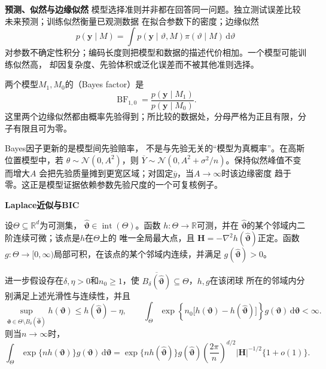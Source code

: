 \par\medskip\noindent\textbf{预测、似然与边缘似然}\quad
模型选择准则并非都在回答同一问题。独立测试误差比较未来预测；训练似然衡量已观测数据
在拟合参数下的密度；边缘似然
\[
  p(\bm y\mid M)
  =\int p(\bm y\mid\vartheta,M)\pi(\vartheta\mid M)\,\mathrm d\vartheta
\]
对参数不确定性积分；编码长度则把模型和数据的描述代价相加。一个模型可能训练似然高，
却因复杂度、先验体积或泛化误差而不被其他准则选择。

\begin{definition}[Bayes因子]
  \label{def:statistics-bayes-factor}
两个模型\(M_1,M_0\)的（Bayes factor）是
\[
  \operatorname{BF}_{1,0}
  =\frac{p(\bm y\mid M_1)}{p(\bm y\mid M_0)}.
\]
这里两个边缘似然都由概率先验得到；所比较的数据处，分母严格为正且有限，分子有限且可为零。
\end{definition}
Bayes因子更新的是模型间先验赔率，
不是与先验无关的“模型为真概率”。在高斯位置模型中，若
\(\theta\sim\mathcal N(0,A^2)\)，则
\(\overline Y\sim\mathcal N(0,A^2+\sigma^2/n)\)。保持似然峰值不变而增大\(A\)
会把先验质量摊到更宽区域；对固定\(\overline y\)，当\(A\to\infty\)时该边缘密度
趋于零。这正是模型证据依赖参数先验尺度的一个可复核例子。

\par\medskip\noindent\textbf{Laplace近似与BIC}\quad
\begin{theorem}[固定维Laplace局部积分近似]
\label{thm:statistics-laplace-approximation}
设\(\Theta\subseteq\mathbb{R}^d\)为可测集，
\(\widehat{\bm\vartheta}\in\operatorname{int}(\Theta)\)。函数
\(h:\Theta\to\mathbb{R}\)可测，并在
\(\widehat{\bm\vartheta}\)的某个邻域内二阶连续可微；该点是\(h\)在\(\Theta\)上的
唯一全局最大点，且
\(\bm H=-\nabla^2h(\widehat{\bm\vartheta})\)正定。函数
\(g:\Theta\to[0,\infty)\)局部可积，在该点的某个邻域内连续，并满足
\(g(\widehat{\bm\vartheta})>0\)。

进一步假设存在\(\delta,\eta>0\)和\(n_0\geq1\)，使
\(\overline{B_\delta(\widehat{\bm\vartheta})}\subseteq\Theta\)，\(h,g\)在该闭球
所在的邻域内分别满足上述光滑性与连续性，并且
\[
  \sup_{\bm\vartheta\in
    \Theta\setminus B_\delta(\widehat{\bm\vartheta})}
  h(\bm\vartheta)
  \leq h(\widehat{\bm\vartheta})-\eta,
  \qquad
  \int_\Theta
  \exp\!\left\{n_0\bigl[h(\bm\vartheta)
    -h(\widehat{\bm\vartheta})\bigr]\right\}
  g(\bm\vartheta)\,\mathrm d\bm\vartheta<\infty.
\]
则当\(n\to\infty\)时，
\[
  \int_\Theta \exp\{n h(\bm\vartheta)\}g(\bm\vartheta)\,
  \mathrm d\bm\vartheta
  =
  \exp\{nh(\widehat{\bm\vartheta})\}
  g(\widehat{\bm\vartheta})
  \left(\frac{2\pi}{n}\right)^{d/2}
  |\bm H|^{-1/2}\{1+o(1)\}.
\]
\end{theorem}

